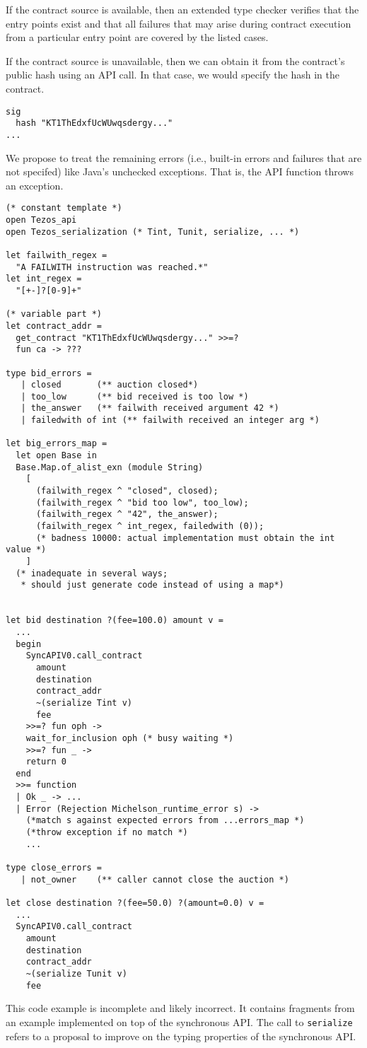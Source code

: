 \documentclass[a4paper]{llncs}
\begin{document}
If the contract source is available, then an extended type checker verifies that the entry points
exist and that all failures that may arise during contract execution from a particular entry point
are covered by the listed cases.

If the contract source is unavailable, then we can obtain it from the
contract's public hash using an API call. In that case, we would
specify the hash in the contract.
\begin{lstlisting}
sig
  hash "KT1ThEdxfUcWUwqsdergy..."
...
\end{lstlisting}

We propose to treat the remaining errors (i.e., built-in errors
and failures that are not specifed) like Java's unchecked
exceptions. That is, the API function throws an exception.


\begin{lstlisting}[caption={Generated implementation},label={lst:generated-implementation}]
(* constant template *)
open Tezos_api
open Tezos_serialization (* Tint, Tunit, serialize, ... *)

let failwith_regex = 
  "A FAILWITH instruction was reached.*"
let int_regex = 
  "[+-]?[0-9]+"

(* variable part *)
let contract_addr = 
  get_contract "KT1ThEdxfUcWUwqsdergy..." >>=? 
  fun ca -> ???

type bid_errors = 
   | closed       (** auction closed*)
   | too_low      (** bid received is too low *)
   | the_answer   (** failwith received argument 42 *)
   | failedwith of int (** failwith received an integer arg *)

let big_errors_map =
  let open Base in
  Base.Map.of_alist_exn (module String)
    [
      (failwith_regex ^ "closed", closed);
      (failwith_regex ^ "bid too low", too_low);
      (failwith_regex ^ "42", the_answer);
      (failwith_regex ^ int_regex, failedwith (0)); 
      (* badness 10000: actual implementation must obtain the int value *)
    ]
  (* inadequate in several ways;
   * should just generate code instead of using a map*)
  

let bid destination ?(fee=100.0) amount v =
  ...
  begin
    SyncAPIV0.call_contract
      amount
      destination
      contract_addr
      ~(serialize Tint v)
      fee
    >>=? fun oph ->
    wait_for_inclusion oph (* busy waiting *)
    >>=? fun _ ->
    return 0
  end
  >>= function
  | Ok _ -> ...
  | Error (Rejection Michelson_runtime_error s) -> 
    (*match s against expected errors from ...errors_map *)
    (*throw exception if no match *)
    ...

type close_errors = 
   | not_owner    (** caller cannot close the auction *)

let close destination ?(fee=50.0) ?(amount=0.0) v =
  ...
  SyncAPIV0.call_contract
    amount
    destination
    contract_addr
    ~(serialize Tunit v)
    fee
\end{lstlisting}
This code example is incomplete and likely incorrect. It contains
fragments from an example implemented on top of the synchronous API.
The call to \lstinline/serialize/ refers to a proposal to improve on
the typing properties of the synchronous API.
\end{document}
